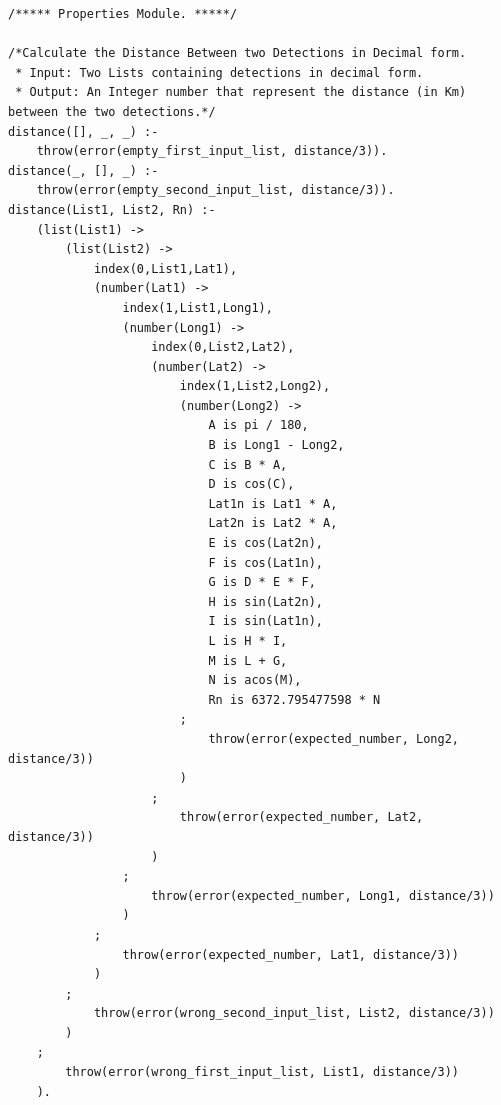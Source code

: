 \documentclass{article}
\begin{document}
\begin{lstlisting}
/***** Properties Module. *****/

/*Calculate the Distance Between two Detections in Decimal form.
 * Input: Two Lists containing detections in decimal form.
 * Output: An Integer number that represent the distance (in Km) between the two detections.*/
distance([], _, _) :-
    throw(error(empty_first_input_list, distance/3)).
distance(_, [], _) :-
    throw(error(empty_second_input_list, distance/3)).
distance(List1, List2, Rn) :-
    (list(List1) -> 
        (list(List2) ->
            index(0,List1,Lat1),
            (number(Lat1) -> 
                index(1,List1,Long1),
                (number(Long1) -> 
                    index(0,List2,Lat2),
                    (number(Lat2) -> 
                        index(1,List2,Long2),
                        (number(Long2) -> 
                            A is pi / 180,
                            B is Long1 - Long2,
                            C is B * A,
                            D is cos(C),
                            Lat1n is Lat1 * A,
                            Lat2n is Lat2 * A,
                            E is cos(Lat2n),
                            F is cos(Lat1n),
                            G is D * E * F,
                            H is sin(Lat2n),
                            I is sin(Lat1n),
                            L is H * I,
                            M is L + G,
                            N is acos(M),
                            Rn is 6372.795477598 * N
                        ;
                            throw(error(expected_number, Long2, distance/3))
                        )
                    ;
                        throw(error(expected_number, Lat2, distance/3))
                    )
                ;
                    throw(error(expected_number, Long1, distance/3))
                )
            ;
                throw(error(expected_number, Lat1, distance/3))
            )
        ;
            throw(error(wrong_second_input_list, List2, distance/3))
        )
    ;
        throw(error(wrong_first_input_list, List1, distance/3))
    ).


\end{lstlisting}
\end{document}

